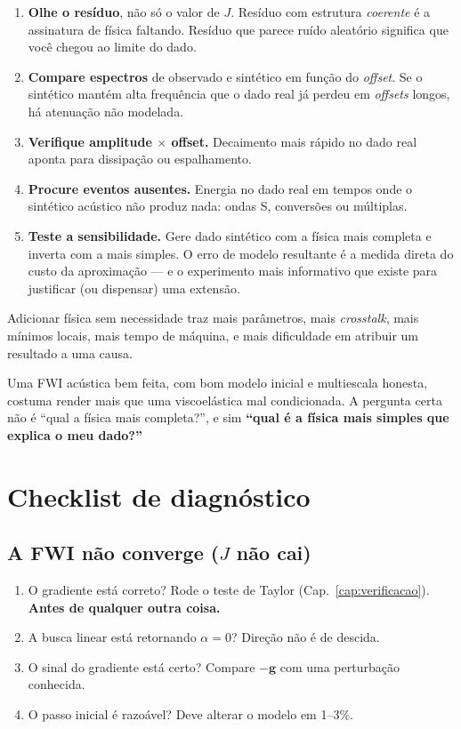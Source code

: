 \documentclass[11pt,a4paper,oneside]{report}
\begin{document}
\begin{enumerate}[leftmargin=*]
\item \textbf{Olhe o resíduo}, não só o valor de $J$. Resíduo com estrutura
\emph{coerente} é a assinatura de física faltando. Resíduo que parece ruído
aleatório significa que você chegou ao limite do dado.
\item \textbf{Compare espectros} de observado e sintético em função do
\emph{offset}. Se o sintético mantém alta frequência que o dado real já perdeu
em \emph{offsets} longos, há atenuação não modelada.
\item \textbf{Verifique amplitude $\times$ offset.} Decaimento mais rápido no
dado real aponta para dissipação ou espalhamento.
\item \textbf{Procure eventos ausentes.} Energia no dado real em tempos onde o
sintético acústico não produz nada: ondas S, conversões ou múltiplas.
\item \textbf{Teste a sensibilidade.} Gere dado sintético com a física mais
completa e inverta com a mais simples. O erro de modelo resultante é a medida
direta do custo da aproximação --- e o experimento mais informativo que existe
para justificar (ou dispensar) uma extensão.
\end{enumerate}

\begin{armadilha}
Adicionar física sem necessidade traz mais parâmetros, mais \emph{crosstalk},
mais mínimos locais, mais tempo de máquina, e mais dificuldade em atribuir um
resultado a uma causa.

Uma FWI acústica bem feita, com bom modelo inicial e multiescala honesta,
costuma render mais que uma viscoelástica mal condicionada. A pergunta certa
não é ``qual a física mais completa?'', e sim \textbf{``qual é a física mais
simples que explica o meu dado?''}
\end{armadilha}

\appendix

\chapter{Checklist de diagnóstico}

\section*{A FWI não converge ($J$ não cai)}
\begin{enumerate}[leftmargin=*]
\item O gradiente está correto? Rode o teste de Taylor
(Cap.~\ref{cap:verificacao}). \textbf{Antes de qualquer outra coisa.}
\item A busca linear está retornando $\alpha = 0$? Direção não é de descida.
\item O sinal do gradiente está certo? Compare $-\mathbf{g}$ com uma
perturbação conhecida.
\item O passo inicial é razoável? Deve alterar o modelo em 1--3\%.
\end{enumerate}
\end{document}
